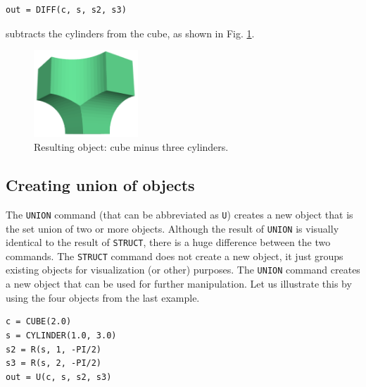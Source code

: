 \begin{bbox}
\begin{verbatim}
out = DIFF(c, s, s2, s3) 
\end{verbatim}
\end{bbox}
\vspace{6mm}

\noindent
subtracts the cylinders from the cube, as shown in Fig. \ref{fig:diff-4}.

\begin{figure}[!ht]
\begin{center}
\includegraphics[width=0.35\textwidth]{img/diff-4b.png}
\end{center}
\vspace{-4mm}
\caption{Resulting object: cube minus three cylinders.}
\label{fig:diff-4}
\end{figure}

\subsection{Creating union of objects}\label{subsec:union}

The {\tt UNION} command (that can be abbreviated as {\tt U})
creates a new object that is the set union 
of two or more objects. Although the result of {\tt UNION}
is visually identical to the result of {\tt STRUCT}, 
there is a huge difference between the two commands.
The {\tt STRUCT} command does not create a new object, it just 
groups existing objects for visualization (or other)  purposes. 
The {\tt UNION} command creates a new 
object that can be used for further manipulation. Let us 
illustrate this by using the four objects from the last 
example. \\

\begin{bbox}
\begin{verbatim}
c = CUBE(2.0)
s = CYLINDER(1.0, 3.0)
s2 = R(s, 1, -PI/2)
s3 = R(s, 2, -PI/2)
out = U(c, s, s2, s3) 
\end{verbatim}
\end{bbox}
\vspace{6mm}


